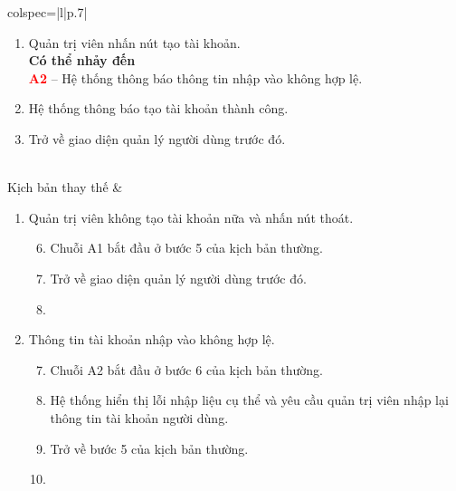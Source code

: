 \documentclass{article}
\begin{document}
\begin{longtblr}[caption = {Đặc tả usecase Tạo tài khoản người dùng},
  label = {tab:usecase1-spec},]{colspec={|l|p{.7\linewidth}|}}
\begin{minipage}{\linewidth}
\begin{enumerate}
      \item Quản trị viên nhấn nút tạo tài khoản.\\
            \textbf{Có thể nhảy đến}\\
            \textbf{\textcolor{red}{A2}} -- Hệ thống thông báo thông tin nhập vào không hợp lệ.
      \item Hệ thống thông báo tạo tài khoản thành công.
      \item Trở về giao diện quản lý người dùng trước đó.
    \end{enumerate}
    \vskip 1pt
  \end{minipage}
  \\\hline
  Kịch bản thay thế    &
  \begin{minipage}{\linewidth}
    \vskip 4pt
    \begin{enumerate}[label={\textbf{\textcolor{red}{A\arabic*}} --}, align=left, itemsep=-5pt]
      \item  Quản trị viên không tạo tài khoản nữa và nhấn nút thoát.  \\
            \vspace{-1.5em}
            \begin{enumerate}[leftmargin=-5px, align=left, label=\arabic*.]
              \setcounter{enumii}{5}
              \item[]
                    \hspace{-25px} Chuỗi A1 bắt đầu ở bước 5 của kịch bản thường.
              \item Trở về giao diện quản lý người dùng trước đó.
              \item[]
            \end{enumerate}
      \item Thông tin tài khoản nhập vào không hợp lệ. \\
            \vspace{-1.5em}
            \begin{enumerate}[leftmargin=-5px, align=left, label=\arabic*.]
              \setcounter{enumii}{6}
              \item[]
                    \hspace{-25px} Chuỗi A2 bắt đầu ở bước 6 của kịch bản thường.
              \item Hệ thống hiển thị lỗi nhập liệu cụ thể và yêu cầu quản trị viên nhập lại thông tin tài khoản người dùng.
              \item Trở về bước 5 của kịch bản thường.  
              \item[]
            \end{enumerate}

\end{enumerate}
\end{minipage}
\end{longtblr}
\end{document}
